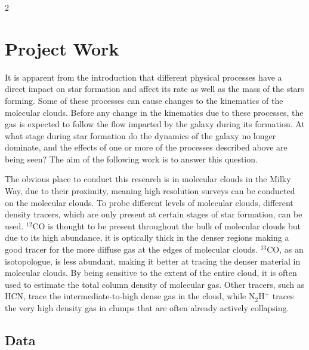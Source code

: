 \documentclass[a4paper,11pt]{article}
\begin{document}
\begin{multicols}{2}

\section*{Project Work}

\par\noindent It is apparent from the introduction that different physical processes have a direct impact on star formation and affect its rate as well as the mass of the stars forming. Some of these processes can cause changes to the kinematics of the molecular clouds. Before any change in the kinematics due to these processes, the gas is expected to follow the flow imparted by the galaxy during its formation. At what stage during star formation do the dynamics of the galaxy no longer dominate, and the effects of one or more of the processes described above are being seen? The aim of the following work is to answer this question. 
\smallskip
\par\noindent The obvious place to conduct this research is in molecular clouds in the Milky Way, due to their proximity, meaning high resolution surveys can be conducted on the molecular clouds. To probe different levels of molecular clouds, different density tracers, which are only present at certain stages of star formation, can be used. $^{12}$CO is thought to be present throughout the bulk of molecular clouds but due to its high abundance, it is optically thick in the denser regions making a good tracer for the more diffuse gas at the edges of molecular clouds. $^{13}$CO, as an isotopologue, is less abundant, making it better at tracing the denser material in molecular clouds. By being sensitive to the extent of the entire cloud, it is often used to estimate the total column density of molecular gas. Other tracers, such as HCN, trace the intermediate-to-high dense gas in the cloud, while N$_{2}$H$^{+}$ traces the very high density gas in clumps that are often already actively collapsing.

\subsection*{Data}


\end{multicols}
\end{document}
